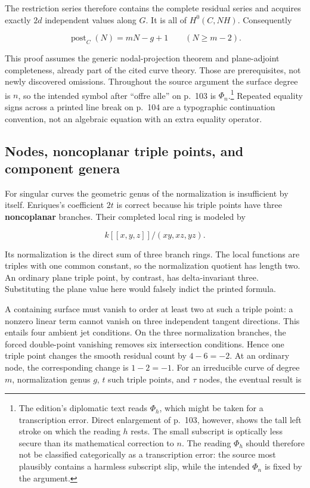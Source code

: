 The restriction series therefore contains the complete residual series and acquires exactly \(2d\) independent values along \(G\). It is all of \(H^0(C,NH)\). Consequently

\[
 \operatorname{post}_C(N)=mN-g+1\qquad(N\geq m-2).
\]

This proof assumes the generic nodal-projection theorem and plane-adjoint completeness, already part of the cited curve theory. Those are prerequisites, not newly discovered omissions. Throughout the source argument the surface degree is \(n\), so the intended symbol after ``offre alle'' on p.~103 is \(\Phi_n\).\footnote{The edition's diplomatic text reads \(\Phi_h\), which might be taken for a transcription error. Direct enlargement of p.~103, however, shows the tall left stroke on which the reading \(h\) rests. The small subscript is optically less secure than its mathematical correction to \(n\). The reading \(\Phi_h\) should therefore not be classified categorically as a transcription error: the source most plausibly contains a harmless subscript slip, while the intended \(\Phi_n\) is fixed by the argument.} Repeated equality signs across a printed line break on p.~104 are a typographic continuation convention, not an algebraic equation with an extra equality operator.

\subsection{Nodes, noncoplanar triple points, and component genera}

For singular curves the geometric genus of the normalization is insufficient by itself. Enriques's coefficient \(2t\) is correct because his triple points have three \textbf{noncoplanar} branches. Their completed local ring is modeled by

\[
 k[[x,y,z]]/(xy,xz,yz).
\]

Its normalization is the direct sum of three branch rings. The local functions are triples with one common constant, so the normalization quotient has length two. An ordinary plane triple point, by contrast, has delta-invariant three. Substituting the plane value here would falsely indict the printed formula.

A containing surface must vanish to order at least two at such a triple point: a nonzero linear term cannot vanish on three independent tangent directions. This entails four ambient jet conditions. On the three normalization branches, the forced double-point vanishing removes six intersection conditions. Hence one triple point changes the smooth residual count by \(4-6=-2\). At an ordinary node, the corresponding change is \(1-2=-1\). For an irreducible curve of degree \(m\), normalization genus \(g\), \(t\) such triple points, and \(\tau\) nodes, the eventual result is


